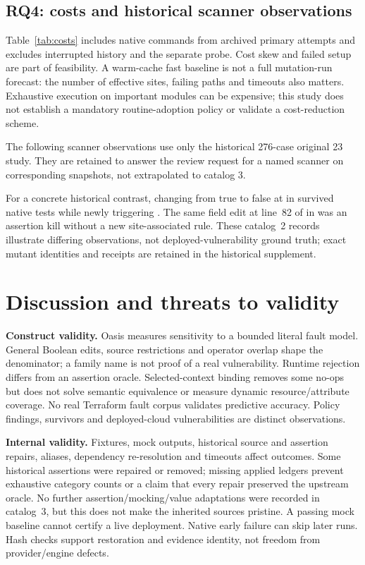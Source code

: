 \subsection{RQ4: costs and historical scanner observations}\label{sec:costs}

Table~\ref{tab:costs} includes native commands from archived primary attempts and excludes interrupted history and the separate probe. Cost skew and failed setup are part of feasibility. A warm-cache fast baseline is not a full mutation-run forecast: the number of effective sites, failing paths and timeouts also matters. Exhaustive execution on important modules can be expensive; this study does not establish a mandatory routine-adoption policy or validate a cost-reduction scheme.

The following scanner observations use only the historical 276-case original 23 study. They are retained to answer the review request for a named scanner on corresponding snapshots, not extrapolated to catalog 3.

For a concrete historical contrast, changing  from true to false at  in  survived native tests while newly triggering . The same field edit at line~82 of  in  was an assertion kill without a new site-associated rule. These catalog~2 records illustrate differing observations, not deployed-vulnerability ground truth; exact mutant identities and receipts are retained in the historical supplement.
\FloatBarrier

\section{Discussion and threats to validity}\label{sec:discussion}\label{sec:threats}
\textbf{Construct validity.} Oasis measures sensitivity to a bounded literal fault model. General Boolean edits, source restrictions and operator overlap shape the denominator; a family name is not proof of a real vulnerability. Runtime rejection differs from an assertion oracle. Selected-context binding removes some no-ops but does not solve semantic equivalence or measure dynamic resource/attribute coverage. No real Terraform fault corpus validates predictive accuracy. Policy findings, survivors and deployed-cloud vulnerabilities are distinct observations.

\textbf{Internal validity.} Fixtures, mock outputs, historical source and assertion repairs, aliases, dependency re-resolution and timeouts affect outcomes. Some historical assertions were repaired or removed; missing applied ledgers prevent exhaustive category counts or a claim that every repair preserved the upstream oracle. No further assertion/mocking/value adaptations were recorded in catalog~3, but this does not make the inherited sources pristine. A passing mock baseline cannot certify a live deployment. Native early failure can skip later runs. Hash checks support restoration and evidence identity, not freedom from provider/engine defects.

